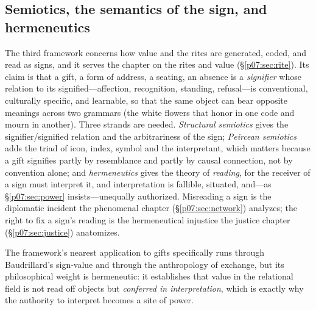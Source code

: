 \documentclass[11pt,a4paper]{article}
\newcommand{\xref}[1]{\textcolor{rose}{\S\ref{#1}}}
\begin{document}
\subsection{Semiotics, the semantics of the sign, and hermeneutics}
The third framework concerns how value and the rites are generated, coded, and read as signs, and it serves the chapter on the rites and value (\xref{p07:sec:rite}). Its claim is that a gift, a form of address, a seating, an absence is a \emph{signifier} whose relation to its signified---affection, recognition, standing, refusal---is conventional, culturally specific, and learnable, so that the same object can bear opposite meanings across two grammars (the white flowers that honor in one code and mourn in another). Three strands are needed. \emph{Structural semiotics} \parencite{saussure1916} gives the signifier/signified relation and the arbitrariness of the sign; \emph{Peircean semiotics} \parencite{peirce_cp} adds the triad of icon, index, symbol and the interpretant, which matters because a gift signifies partly by resemblance and partly by causal connection, not by convention alone; and \emph{hermeneutics} \parencite{ricoeur1976,gadamer1960} gives the theory of \emph{reading}, for the receiver of a sign must interpret it, and interpretation is fallible, situated, and---as \xref{p07:sec:power} insists---unequally authorized. Misreading a sign is the diplomatic incident the phenomenal chapter (\xref{p07:sec:network}) analyzes; the right to fix a sign's reading is the hermeneutical injustice the justice chapter (\xref{p07:sec:justice}) anatomizes.

The framework's nearest application to gifts specifically runs through Baudrillard's sign-value \parencite{baudrillard1972} and through the anthropology of exchange, but its philosophical weight is hermeneutic: it establishes that value in the relational field is not read off objects but \emph{conferred in interpretation}, which is exactly why the authority to interpret becomes a site of power.
\end{document}
